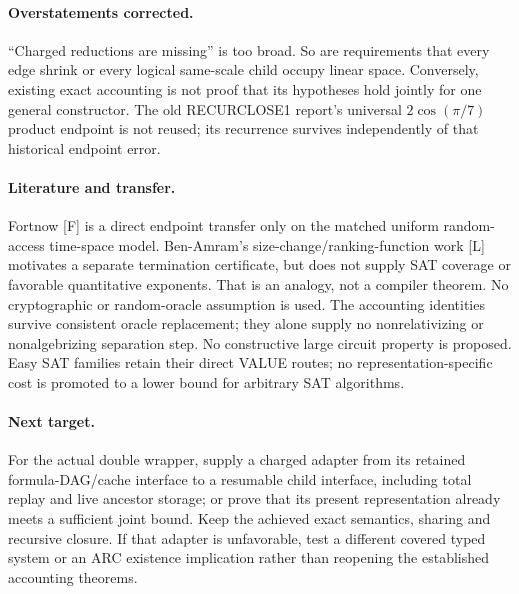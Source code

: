 \documentclass[11pt]{article}
\begin{document}
\paragraph{Overstatements corrected.}
``Charged reductions are missing'' is too broad. So are requirements that
every edge shrink or every logical same-scale child occupy linear space.
Conversely, existing exact accounting is not proof that its hypotheses hold
jointly for one general constructor. The old RECURCLOSE1 report's universal
$2\cos(\pi/7)$ product endpoint is not reused; its recurrence survives
independently of that historical endpoint error.

\paragraph{Literature and transfer.}
Fortnow [F] is a direct endpoint transfer only on the matched uniform
random-access time-space model. Ben-Amram's size-change/ranking-function
work [L] motivates a separate termination certificate, but does not supply
SAT coverage or favorable quantitative exponents. That is an analogy,
not a compiler theorem. No cryptographic or random-oracle assumption is
used. The accounting identities survive consistent oracle replacement;
they alone supply no nonrelativizing or nonalgebrizing separation step.
No constructive large circuit property is proposed. Easy SAT families
retain their direct VALUE routes; no representation-specific cost is
promoted to a lower bound for arbitrary SAT algorithms.

\paragraph{Next target.}
For the actual double wrapper, supply a charged adapter from its retained
formula-DAG/cache interface to a resumable child interface, including total
replay and live ancestor storage; or prove that its present representation
already meets a sufficient joint bound. Keep the achieved exact semantics,
sharing and recursive closure. If that adapter is unfavorable, test a
different covered typed system or an ARC existence implication rather than
reopening the established accounting theorems.
\end{document}
